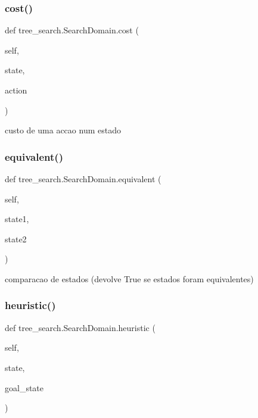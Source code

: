 \subsubsection{\texorpdfstring{cost()}{cost()}}
{\footnotesize\ttfamily def tree\+\_\+search.\+Search\+Domain.\+cost (\begin{DoxyParamCaption}\item[{}]{self,  }\item[{}]{state,  }\item[{}]{action }\end{DoxyParamCaption})}

\begin{DoxyVerb}custo de uma accao num estado\end{DoxyVerb}
 \mbox{\label{classtree__search_1_1_search_domain_a5ccccbd28a0a914082558dead4690842}} 
\subsubsection{\texorpdfstring{equivalent()}{equivalent()}}
{\footnotesize\ttfamily def tree\+\_\+search.\+Search\+Domain.\+equivalent (\begin{DoxyParamCaption}\item[{}]{self,  }\item[{}]{state1,  }\item[{}]{state2 }\end{DoxyParamCaption})}

\begin{DoxyVerb}comparacao de estados (devolve True se estados foram equivalentes)\end{DoxyVerb}
 \mbox{\label{classtree__search_1_1_search_domain_a16377c0c9f043989856be86c1900b065}} 
\subsubsection{\texorpdfstring{heuristic()}{heuristic()}}
{\footnotesize\ttfamily def tree\+\_\+search.\+Search\+Domain.\+heuristic (\begin{DoxyParamCaption}\item[{}]{self,  }\item[{}]{state,  }\item[{}]{goal\+\_\+state }\end{DoxyParamCaption})}

